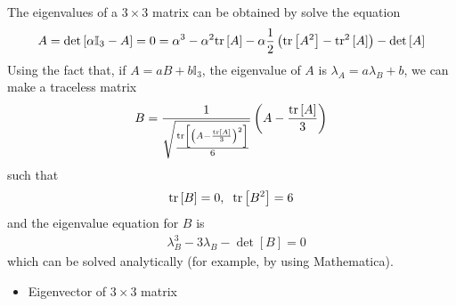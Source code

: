 The eigenvalues of a $3\times 3$ matrix can be obtained by solve the equation
\begin{equation}
\begin{split}
&A=\det \left[\alpha \mathbb{I}_3- A\right]=0=\alpha ^3-\alpha ^2 {\rm tr}\left[A\right]-\alpha \frac{1}{2}\left({\rm tr}\left[A^2\right]-{\rm tr}^2\left[A\right]\right)-\det \left[A\right]\\
\end{split}
\end{equation}
Using the fact that, if $A=a B +b\mathbb{I}_3$, the eigenvalue of $A$ is $\lambda _A = a \lambda _B+b$, we can make a traceless matrix
\begin{equation}
\begin{split}
&B=\frac{1}{\sqrt{\frac{{\rm tr}\left[\left(A-\frac{{\rm tr}\left[A\right]}{3}\right)^2\right]}{6}}}\left(A-\frac{{\rm tr}\left[A\right]}{3}\right)\\
\end{split}
\end{equation}
such that
\begin{equation}
\begin{split}
&{\rm tr}\left[B\right]=0,\;\;{\rm tr}\left[B^2\right]=6\\
\end{split}
\end{equation}
and the eigenvalue equation for $B$ is
\begin{equation}
\begin{split}
&\lambda _B^3-3\lambda _B -\det \left[B\right]=0
\end{split}
\end{equation}
which can be solved analytically (for example, by using Mathematica).


\begin{itemize}
  \item Eigenvector of $3\times 3$ matrix
\end{itemize}
